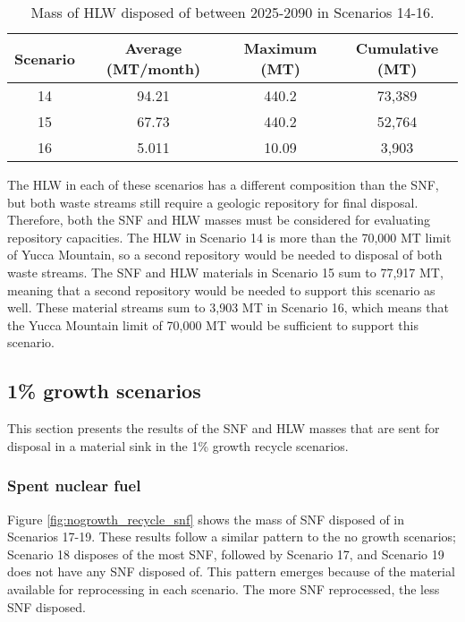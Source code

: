 \begin{table}[h!]
    \centering 
    \caption{Mass of HLW disposed of between 2025-2090 in 
    Scenarios 14-16.}
    \label{tab:s14-16_hlw}
    \begin{tabular}{c c c c}
        \hline 
        Scenario & Average (MT/month) & Maximum (MT) & Cumulative (MT) \\
        \hline
        14 & 94.21 & 440.2 & 73,389\\
        15 & 67.73 & 440.2 & 52,764\\
        16 & 5.011 & 10.09 & 3,903\\
        \hline
    \end{tabular}
\end{table}

The \gls{HLW} in each of these scenarios has a different 
composition than the \gls{SNF}, but both waste streams 
still require a geologic repository for final 
disposal. Therefore, both the \gls{SNF} and \gls{HLW} 
masses must be considered for evaluating repository 
capacities. The \gls{HLW} in Scenario 14 is more than 
the 70,000 MT limit of Yucca Mountain, so a second 
repository would be needed to disposal of both waste 
streams. The \gls{SNF} and \gls{HLW} materials in 
Scenario 15 sum to 77,917 MT, meaning that a second 
repository would be needed to support this scenario 
as well. These material streams sum to 3,903 MT in 
Scenario 16, which means that the Yucca Mountain 
limit of 70,000 MT would be sufficient to support this 
scenario. 


\subsection{1\% growth scenarios}
This section presents the results of the \gls{SNF} and 
\gls{HLW} masses that are sent for disposal in a 
material sink in the 1\% growth recycle scenarios. 

\subsubsection{Spent nuclear fuel}
Figure \ref{fig:nogrowth_recycle_snf} shows the mass of \gls{SNF} 
disposed of in Scenarios 17-19. These results follow a similar 
pattern to the no growth scenarios; Scenario 18 disposes of 
the most \gls{SNF}, followed by Scenario 17, and Scenario 
19 does not have any \gls{SNF} disposed of. This pattern 
emerges because of the material available for reprocessing 
in each scenario. The more \gls{SNF} reprocessed, the less 
\gls{SNF} disposed. 

